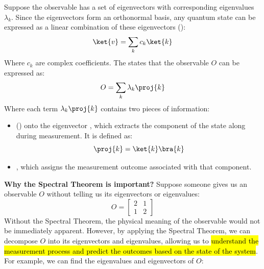 \highspace
Suppose the observable has a set of eigenvectors  with corresponding eigenvalues $\lambda_k$. Since the eigenvectors form an orthonormal basis, any quantum state  can be expressed as a linear combination of these eigenvectors ():
\begin{equation*}
    \ket{v} = \sum_k c_k \ket{k}
\end{equation*}
Where $c_k$ are complex coefficients. The  states that the observable $O$ can be expressed as:
\begin{equation}\label{eq:spectral-decomposition}
    O = \sum_k \lambda_k \proj{k}
\end{equation}
Where each term $\lambda_k \proj{k}$ contains two pieces of information:
\begin{itemize}
    \item {} () onto the eigenvector , which extracts the component of the state along  during measurement. It is defined as:
    \begin{equation*}
        \proj{k} = \ket{k}\bra{k}
    \end{equation*}
    \item {}, which assigns the measurement outcome associated with that component.
\end{itemize}
\textcolor{Green3}{ \textbf{Why the Spectral Theorem is important?}} Suppose someone gives us an observable $O$ without telling us its eigenvectors or eigenvalues:
\begin{equation*}
    O =
    \begin{bmatrix}
        2 & 1 \\
        1 & 2
    \end{bmatrix}
\end{equation*}
Without the Spectral Theorem, the physical meaning of the observable would not be immediately apparent. However, by applying the Spectral Theorem, we can decompose $O$ into its eigenvectors and eigenvalues, allowing us to \hl{understand the measurement process and predict the outcomes based on the state of the system}. For example, we can find the eigenvalues and eigenvectors of $O$:
